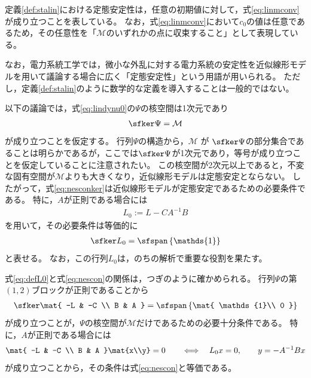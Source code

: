 \documentclass[tombow,dvipdfmx]{corona-a5-1.1}
\begin{document}
定義\ref{def:stalin}における定態安定性は，任意の初期値に対して，式\ref{eq:linmconv}が成り立つことを表している。
なお，式\ref{eq:linmconv}において$c_0$の値は任意であるため，その任意性を「$\mathcal{M}$のいずれかの点に収束すること」として表現している。

なお，電力系統工学では，微小な外乱に対する電力系統の安定性を近似線形モデルを用いて議論する場合に広く「定態安定性」という用語が用いられる。
ただし，定義\ref{def:stalin}のように数学的な定義を導入することは一般的ではない。


以下の議論では，式\ref{eq:lindynu0}の$\Psi$の核空間は1次元であり
\begin{align}\label{eq:nesconker}
\sfker \Psi = \mathcal{M}
\end{align}
が成り立つことを仮定する。
行列$\Psi$の構造から，$\mathcal{M}$ が $\sfker \Psi $の部分集合であることは明らかであるが，ここでは$\sfker \Psi$が1次元であり，等号が成り立つことを仮定していることに注意されたい。
この核空間が2次元以上であると，不変な固有空間が$\mathcal{M}$よりも大きくなり，近似線形モデルは定態安定とならない。
したがって，式\ref{eq:nesconker}は近似線形モデルが定態安定であるための必要条件である。
特に，$A$が正則である場合には
\begin{align}\label{eq:defL0}
L_0:= L-CA^{-1}B 
\end{align}
を用いて，その必要条件は等価的に
\begin{align}\label{eq:nescon}
\sfker L_0 = \sfspan
\left\{
\mathds{1}
\right\}
\end{align}
と表せる。
なお，この行列$L_0$は，のちの解析で重要な役割を果たす。

式\ref{eq:defL0}と式\ref{eq:nescon}の関係は，つぎのように確かめられる。
行列$\Psi$の第$(1,2)$ブロックが正則であることから
\begin{align*}%
\sfker \mat{
-L & -C \\
B & A
}
= \sfspan
\left\{
\mat{
\mathds{1}\\
0
}
\right\}
\end{align*}
が成り立つことが，$\Psi$の核空間が$\mathcal{M}$だけであるための必要十分条件である。
特に，$A$が正則である場合には
\begin{align*}
\mat{
-L & -C \\
B & A
}\mat{x\\y}
=0
\qquad
\Longleftrightarrow
\quad
L_0 x=0,
\qquad
y=-A^{-1}Bx
\end{align*}
が成り立つことから，その条件は式\ref{eq:nescon}と等価である。
\end{document}
